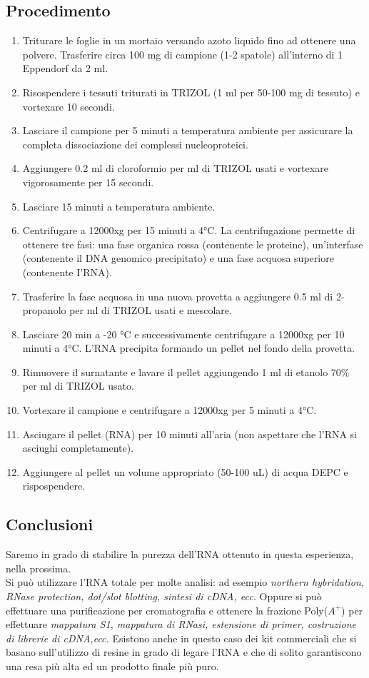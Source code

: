 \documentclass{extarticle}
\begin{document}
\subsection*{Procedimento}
\begin{enumerate}
    \item Triturare le foglie in un mortaio versando azoto liquido fino ad ottenere una polvere.
    Trasferire circa 100 mg di campione (1-2 spatole) all'interno di 1 Eppendorf da 2 ml.
    \item Risospendere i tessuti triturati in TRIZOL (1 ml per 50-100 mg di tessuto) e vortexare 10 secondi.
    \item Lasciare il campione per 5 minuti a temperatura ambiente per assicurare la completa dissociazione dei
    complessi nucleoproteici.
    \item Aggiungere 0.2 ml di cloroformio per ml di TRIZOL usati e vortexare vigorosamente per 15 secondi.
    \item Lasciare 15 minuti a temperatura ambiente.
    \item Centrifugare a 12000xg per 15 minuti a 4°C. La centrifugazione permette di ottenere tre fasi: una fase
    organica rossa (contenente le proteine), un'interfase (contenente il DNA genomico precipitato) e una fase
    acquosa superiore (contenente I'RNA).
    \item Trasferire la fase acquosa in una nuova provetta a aggiungere 0.5 ml di 2-propanolo per ml di TRIZOL usati
    e mescolare.
    \item Lasciare 20 min a -20 °C e successivamente centrifugare a 12000xg per 10 minuti a 4°C. L'RNA precipita
    formando un pellet nel fondo della provetta.
    \item Rimuovere il surnatante e lavare il pellet aggiungendo 1 ml di etanolo $70\%$ per ml di TRIZOL usato.
    \item Vortexare il campione e centrifugare a 12000xg per 5 minuti a 4°C.
    \item Asciugare il pellet (RNA) per 10 minuti all'aria (non aspettare che l'RNA si asciughi completamente).
    \item Aggiungere al pellet un volume appropriato (50-100 uL) di acqua DEPC e rispospendere.
\end{enumerate}
\subsection*{Conclusioni} Saremo in grado di stabilire la purezza dell'RNA ottenuto in questa esperienza, nella prossima.\\Si può utilizzare l'RNA totale per molte analisi: ad esempio \textit{northern hybridation, RNase protection, dot/slot blotting, sintesi di cDNA, ecc.} Oppure si può effettuare una purificazione per cromatografia e ottenere la frazione Poly($A^+$) per effettuare \textit{mappatura S1, mappatura di RNasi, estensione di primer, costruzione di librerie di cDNA,ecc.}
Esistono anche in questo caso dei kit commerciali che si basano sull'utilizzo di resine in grado di legare l'RNA e che di solito garantiscono una resa più alta ed un prodotto finale più puro.
\end{document}
